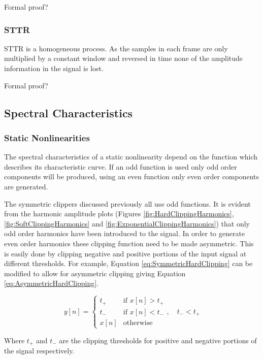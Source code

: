 			\note
			{
				Formal proof?
			}

		\subsubsection*{STTR}
			STTR is a homogeneous process. As the samples in each frame are only multiplied
			by a constant window and reversed in time none of the amplitude information in the signal is lost. 

			\note
			{
				Formal proof?
			}

	\subsection{Spectral Characteristics}
	\label{sec:ExcitationEvaluation-Comparison-SpectralCharacteristics}
		\subsubsection*{Static Nonlinearities}
			The spectral characteristics of a static nonlinearity depend on the function which describes its
			characteristic curve. If an odd function is used only odd order components will be produced, using
			an even function only even order components are generated. 

			The symmetric clippers discussed previously all use odd functions. It is evident from the harmonic
			amplitude plots (Figures \ref{fig:HardClippingHarmonics}, \ref{fig:SoftClippingHarmonics} and
			\ref{fig:ExponentialClippingHarmonics}) that only odd order harmonics have been introduced to the
			signal. In order to generate even order harmonics these clipping function need to be made
			asymmetric. This is easily done by clipping negative and positive portions of the input signal at
			different thresholds. For example, Equation \ref{eq:SymmetricHardClipping} can be modified to allow
			for asymmetric clipping giving Equation \ref{eq:AsymmetricHardClipping}.
			
			\begin{equation}
				y[n] = \begin{cases}
					t_{+} & \text{if $x[n] > t_{+}$} \\
					t_{-} & \text{if $x[n] < t_{-}$} \\
					x[n] & \text{otherwise}
				\end{cases}, \quad t_{-} < t_{+}
				\label{eq:AsymmetricHardClipping}
			\end{equation}

			Where $t_{+}$ and $t_{-}$ are the clipping thresholds for positive and negative portions of the
			signal respectively.	

